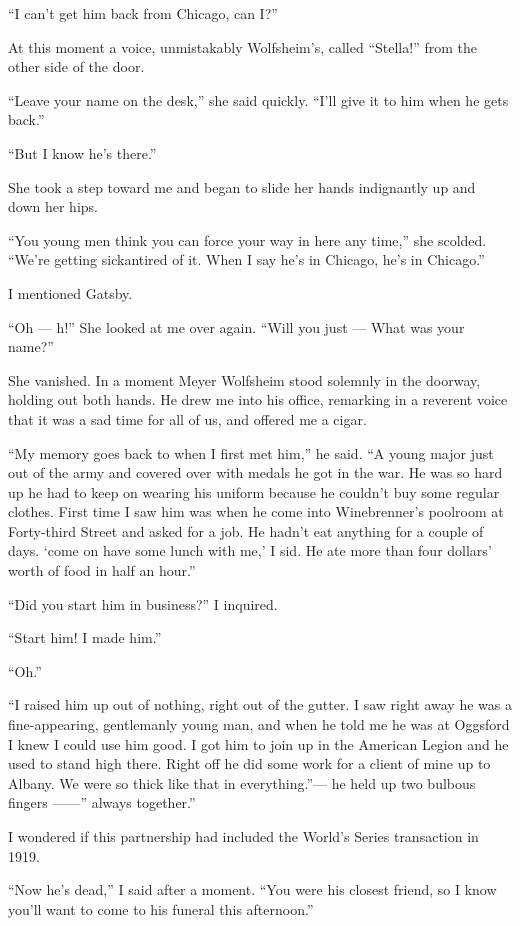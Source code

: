 \documentclass{znotebook}
\begin{document}
``I can’t get him back from Chicago, can I?''

At this moment a voice, unmistakably Wolfsheim’s, called ``Stella!'' from the other side of the door.

``Leave your name on the desk,'' she said quickly. ``I’ll give it to him when he gets back.''

``But I know he’s there.''

She took a step toward me and began to slide her hands indignantly up and down her hips.

``You young men think you can force your way in here any time,'' she scolded. ``We’re getting sickantired of it. When I say he’s in Chicago, he’s in Chicago.''

I mentioned Gatsby.

``Oh — h!'' She looked at me over again. ``Will you just — What was your name?''

She vanished. In a moment Meyer Wolfsheim stood solemnly in the doorway, holding out both hands. He drew me into his office, remarking in a reverent voice that it was a sad time for all of us, and offered me a cigar.

``My memory goes back to when I first met him,'' he said. ``A young major just out of the army and covered over with medals he got in the war. He was so hard up he had to keep on wearing his uniform because he couldn’t buy some regular clothes. First time I saw him was when he come into Winebrenner’s poolroom at Forty-third Street and asked for a job. He hadn’t eat anything for a couple of days. ‘come on have some lunch with me,’ I sid. He ate more than four dollars’ worth of food in half an hour.''

``Did you start him in business?'' I inquired.

``Start him! I made him.''

``Oh.''

``I raised him up out of nothing, right out of the gutter. I saw right away he was a fine-appearing, gentlemanly young man, and when he told me he was at Oggsford I knew I could use him good. I got him to join up in the American Legion and he used to stand high there. Right off he did some work for a client of mine up to Albany. We were so thick like that in everything.''— he held up two bulbous fingers ——'' always together.''

I wondered if this partnership had included the World’s Series transaction in 1919.

``Now he’s dead,'' I said after a moment. ``You were his closest friend, so I know you’ll want to come to his funeral this afternoon.''
\end{document}
